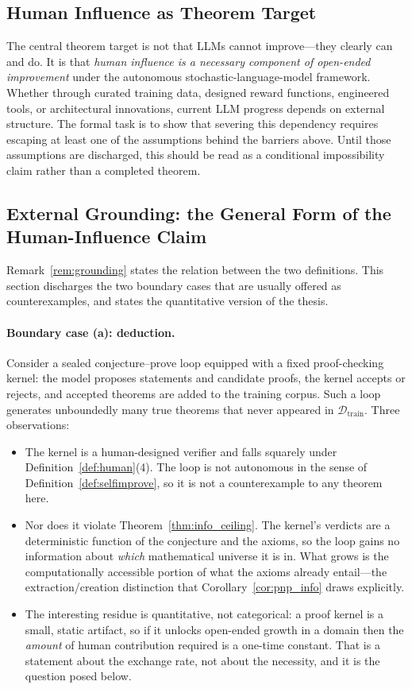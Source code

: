 \documentclass[11pt,a4paper]{article}
\begin{document}
\subsection{Human Influence as Theorem Target}
\label{sec:human_target}

The central theorem target is not that LLMs cannot improve---they clearly can and do. It is that \emph{human influence is a necessary component of open-ended improvement} under the autonomous stochastic-language-model framework. Whether through curated training data, designed reward functions, engineered tools, or architectural innovations, current LLM progress depends on external structure. The formal task is to show that severing this dependency requires escaping at least one of the assumptions behind the barriers above. Until those assumptions are discharged, this should be read as a conditional impossibility claim rather than a completed theorem.

\subsection{External Grounding: the General Form of the Human-Influence Claim}
\label{sec:grounding_discussion}

Remark~\ref{rem:grounding} states the relation between the two definitions. This section discharges the two boundary cases that are usually offered as counterexamples, and states the quantitative version of the thesis.

\paragraph{Boundary case (a): deduction.} Consider a sealed conjecture--prove loop equipped with a fixed proof-checking kernel: the model proposes statements and candidate proofs, the kernel accepts or rejects, and accepted theorems are added to the training corpus. Such a loop generates unboundedly many true theorems that never appeared in $\mathcal{D}_{\mathrm{train}}$. Three observations:

\begin{itemize}
    \item The kernel is a human-designed verifier and falls squarely under Definition~\ref{def:human}(4). The loop is not autonomous in the sense of Definition~\ref{def:selfimprove}, so it is not a counterexample to any theorem here.
    \item Nor does it violate Theorem~\ref{thm:info_ceiling}. The kernel's verdicts are a deterministic function of the conjecture and the axioms, so the loop gains no information about \emph{which} mathematical universe it is in. What grows is the computationally accessible portion of what the axioms already entail---the extraction/creation distinction that Corollary~\ref{cor:pnp_info} draws explicitly.
    \item The interesting residue is quantitative, not categorical: a proof kernel is a small, static artifact, so if it unlocks open-ended growth in a domain then the \emph{amount} of human contribution required is a one-time constant. That is a statement about the exchange rate, not about the necessity, and it is the question posed below.
\end{itemize}
\end{document}
